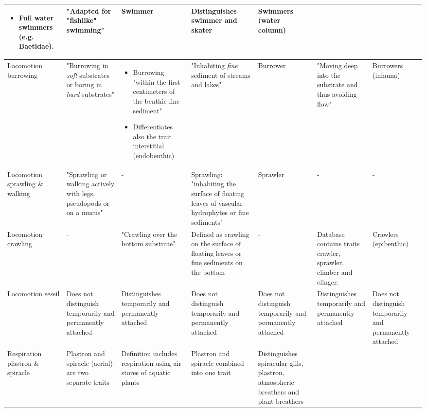 \documentclass[../Draft_harmonization_paper.tex]{subfiles}
\begin{document}
\begin{landscape}
\begin{longtable}{m{1.8cm}|m{3cm}|m{3cm}|m{3cm}|m{3cm}|m{3cm}|m{3cm}}
\begin{itemize}
            \item Full water swimmers (e.g. Baetidae).
        \end{itemize} & 
        "Adapted for "fishlike" swimming" & 
        Swimmer & 
        Distinguishes swimmer and skater & 
        Swimmers (water column)
        \\
        \midrule
        Locomotion burrowing & 
        "Burrowing in \textit{soft} substrates or boring in \textit{hard} substrates" & 
        \begin{itemize}
            \item Burrowing "within the first centimeters of the benthic fine sediment"
            \item Differentiates also the trait interstitial (endobenthic)
        \end{itemize} & 
        "Inhabiting \textit{fine} sediment of streams and lakes" &
        Burrower & 
        "Moving deep into the substrate and thus avoiding flow" &
        Burrowers (infauna)
        \\
        \midrule
        Locomotion sprawling \& walking & 
        "Sprawling or walking actively with legs, pseudopods or on a mucus" &
        - & 
        Sprawling: "inhabiting the surface of floating leaves of vascular hydrophytes or fine sediments" & 
        Sprawler &
        - & 
        - \\
        \midrule
        Locomotion crawling & 
        - &
        "Crawling over the bottom substrate" & 
        Defined as crawling on the surface of floating leaves or fine sediments on the bottom & 
        - & 
        Database contains traits crawler, 
        sprawler, climber and clinger. &
        Crawlers (epibenthic) \\
        \midrule
        Locomotion sessil & 
        Does not distinguish temporarily and permanently attached & 
        Distinguishes temporarily and permanently attached & 
        Does not distinguish temporarily and permanently attached & 
        Does not distinguish temporarily and permanently attached & 
        Distinguishes temporarily and permanently attached & 
        Does not distinguish temporarily and permanently attached \\
        \toprule[.1em]
        Respiration plastron \& spiracle & 
        Plastron and spiracle (aerial) are two separate traits & 
        Definition includes respiration using air stores of aquatic plants & 
        Plastron and spiracle combined into one trait & 
        Distinguishes spiracular gills, plastron, atmospheric breathers and plant breathers &

\end{longtable}
\end{landscape}
\end{document}
